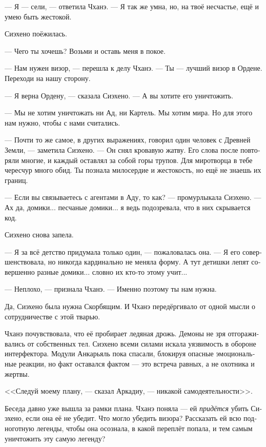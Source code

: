 \documentclass[a4paper,12pt,fleqn]{book}\usepackage{cooltooltips}\usepackage{polyglossia}\setdefaultlanguage[babelshorthands=true]{russian}\setotherlanguage{english}\defaultfontfeatures{Ligatures=TeX,Mapping=tex-text} \usepackage{xcolor}\definecolor{lightgray}{HTML}{bbbbbb}\color{lightgray}\newcommand{\ml}[3]{\textenglish{\textcolor{black}{#3}}}
\newcommand{\textspace}{\vspace{1em}{\centering\Large\bfseries<...>\par}\vspace{1em}}
\begin{document}
{--- Я --- сели, --- ответила Чханэ.
--- Я так же умна, но, на твоё несчастье, ещё и умею быть жестокой.

Сиэхено поёжилась.

--- Чего ты хочешь?
Возьми и оставь меня в покое.

--- Нам нужен визор, --- перешла к делу Чханэ.
--- Ты --- лучший визор в Ордене.
Переходи на нашу сторону.

--- Я верна Ордену, --- сказала Сиэхено.
--- А вы хотите его уничтожить.

--- Мы не хотим уничтожать ни Ад, ни Картель.
Мы хотим мира.
Но для этого нам нужно, чтобы с нами считались.

--- Почти то же самое, в других выражениях, говорил один человек с Древней Земли, --- заметила Сиэхено.
--- Он снял кровавую жатву.
Его слова после повторяли многие, и каждый оставлял за собой горы трупов.
Для миротворца в тебе чересчур много обид.
Ты познала милосердие и жестокость, но ещё не знаешь их границ.

\textspace

--- Если вы связываетесь с агентами в Аду, то как? --- промурлыкала Сиэхено.
--- Ах да, домики... песчаные домики... я ведь подозревала, что в них скрывается код.

Сиэхено снова запела.

--- Я за всё детство придумала только один, --- пожаловалась она.
--- Я его совершенствовала, но никогда кардинально не меняла форму.
А тут детишки лепят совершенно разные домики... словно их кто-то этому учит...

--- Неплохо, --- признала Чханэ.
--- Именно поэтому ты нам нужна.

Да, Сиэхено была нужна Скорбящим.
И Чханэ передёргивало от одной мысли о сотрудничестве с этой тварью.

\textspace

Чханэ почувствовала, что её пробирает ледяная дрожь.
Демоны не зря отгораживались от собственных тел.
Сиэхено всеми силами искала уязвимость в обороне интерфектора.
Модули Анкарьяль пока спасали, блокируя опасные эмоциональные реакции, но факт оставался фактом --- это встреча равных, а не охотника и жертвы.

<<Следуй моему плану, --- сказал Аркадиу, --- никакой самодеятельности>>.

Беседа давно уже вышла за рамки плана.
Чханэ поняла --- ей \emph{придётся} убить Сиэхено, если она её не убедит.
Что могло убедить визора?
Рассказать ей всю подноготную легенды, чтобы она осознала, в какой переплёт попала, и тем самым уничтожить эту самую легенду?

}
\end{document}
